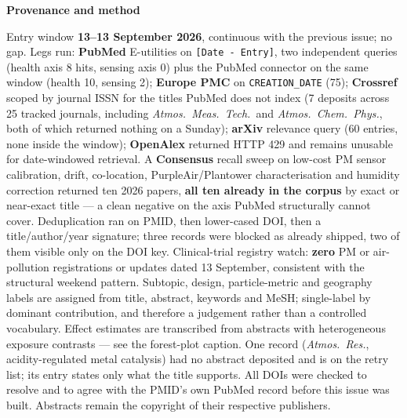 \documentclass[10pt]{article}
\begin{document}
\vspace{4mm}
\begin{keybox}
{\sffamily\bfseries\footnotesize\color{Deep}Provenance and method}\\[1.2mm]
{\fontsize{7.2}{8.8}\selectfont
Entry window \textbf{13--13 September 2026}, continuous with the previous issue; no gap.
Legs run: \textbf{PubMed} E-utilities on \texttt{[Date - Entry]}, two independent queries
(health axis 8 hits, sensing axis 0) plus the PubMed connector on the same window
(health 10, sensing 2); \textbf{Europe PMC} on \texttt{CREATION\_DATE} (75);
\textbf{Crossref} scoped by journal ISSN for the titles PubMed does not index
(7 deposits across 25 tracked journals, including \textit{Atmos.\ Meas.\ Tech.}\ and
\textit{Atmos.\ Chem.\ Phys.}, both of which returned nothing on a Sunday);
\textbf{arXiv} relevance query (60 entries, none inside the window);
\textbf{OpenAlex} returned HTTP 429 and remains unusable for date-windowed retrieval.
A \textbf{Consensus} recall sweep on low-cost PM sensor calibration, drift, co-location,
PurpleAir/Plantower characterisation and humidity correction returned ten 2026 papers,
\textbf{all ten already in the corpus} by exact or near-exact title --- a clean negative
on the axis PubMed structurally cannot cover.
Deduplication ran on PMID, then lower-cased DOI, then a title/author/year signature;
three records were blocked as already shipped, two of them visible only on the DOI key.
Clinical-trial registry watch: \textbf{zero} PM or air-pollution registrations or updates
dated 13 September, consistent with the structural weekend pattern.
Subtopic, design, particle-metric and geography labels are assigned from title, abstract,
keywords and MeSH; single-label by dominant contribution, and therefore a judgement
rather than a controlled vocabulary.
Effect estimates are transcribed from abstracts with heterogeneous exposure contrasts ---
see the forest-plot caption. One record (\textit{Atmos.\ Res.}, acidity-regulated metal
catalysis) had no abstract deposited and is on the retry list; its entry states only what
the title supports.
All DOIs were checked to resolve and to agree with the PMID's own PubMed record before
this issue was built. Abstracts remain the copyright of their respective publishers.\par}
\end{keybox}
\end{document}
